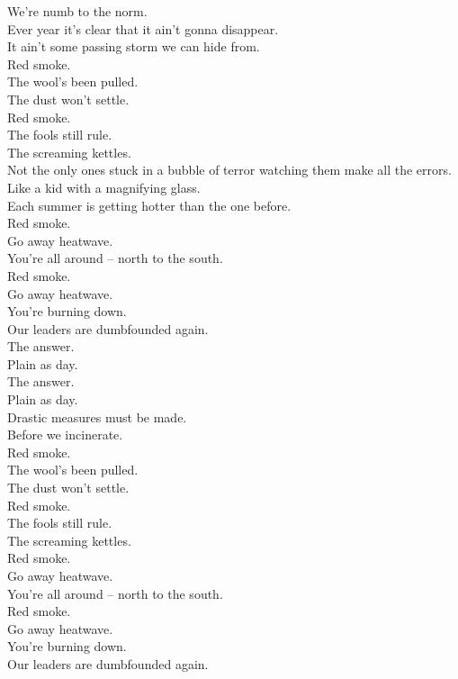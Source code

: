 We're numb to the norm. \\
Ever year it's clear that it ain't gonna disappear. \\
It ain't some passing storm we can hide from. \\

Red smoke. \\
The wool's been pulled. \\
The dust won't settle. \\
Red smoke. \\
The fools still rule. \\
The screaming kettles. \\

Not the only ones stuck in a bubble of terror watching them make all the errors. \\
Like a kid with a magnifying glass. \\
Each summer is getting hotter than the one before. \\

Red smoke. \\
Go away heatwave. \\
You're all around -- north to the south. \\
Red smoke. \\
Go away heatwave. \\
You're burning down. \\
Our leaders are dumbfounded again. \\

The answer. \\
Plain as day. \\
The answer. \\
Plain as day. \\
Drastic measures must be made. \\
Before we incinerate. \\

Red smoke. \\
The wool's been pulled. \\
The dust won't settle. \\
Red smoke. \\
The fools still rule. \\
The screaming kettles. \\
Red smoke. \\
Go away heatwave. \\
You're all around -- north to the south. \\
Red smoke. \\
Go away heatwave. \\
You're burning down. \\
Our leaders are dumbfounded again. \\

